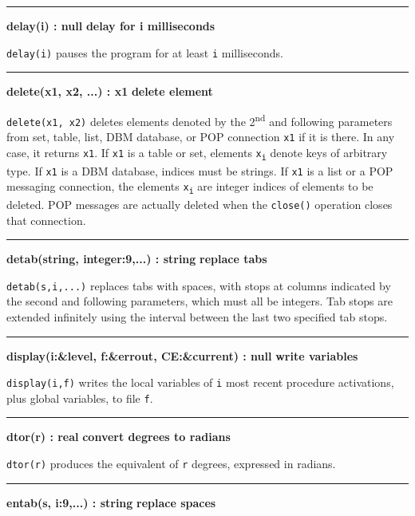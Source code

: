 \bigskip\hrule\vspace{0.1cm}
\noindent
{\bf delay(i) : null } \hfill {\bf delay for i milliseconds}

\noindent
{}\texttt{delay(i)} pauses the program for at least
\texttt{i} milliseconds.

\bigskip\hrule\vspace{0.1cm}
\noindent
{\bf delete(x1, x2, ...) : x1 } \hfill {\bf delete element}\WarningNotThreadSafe

\noindent
{}\texttt{delete(x1, x2)} deletes elements denoted by the
2\textsuperscript{nd} and following parameters from set, table, list,
DBM database, or POP connection \texttt{x1} if it is there. In any case, it
returns \texttt{x1}. If \texttt{x1} is a table or set, elements
\texttt{x\textsubscript{i}} denote
keys of arbitrary type. If \texttt{x1} is a DBM database, indices must be
strings. If \texttt{x1} is a list or a POP messaging connection,
the elements \texttt{x\textsubscript{i}} are
integer indices of elements to be deleted. POP messages are actually
deleted when the \texttt{close()} operation closes that connection.

\bigskip\hrule\vspace{0.1cm}
\noindent
{\bf detab(string, integer:9,...) : string } \hfill {\bf replace tabs}

\noindent
\texttt{detab(s,i,...)} replaces tabs with spaces, with stops at columns
indicated by the second and following parameters, which must all be
integers. Tab stops are extended infinitely using the interval between
the last two specified tab stops.

\bigskip\hrule\vspace{0.1cm}
\noindent
{\bf display(i:\&level, f:\&errout, CE:\&current) : null } \hfill {\bf write variables}

\noindent
{}\texttt{display(i,f)} writes the local variables
of \texttt{i} most recent procedure activations, plus global
variables, to file \texttt{f}.

\bigskip\hrule\vspace{0.1cm}
\noindent
{\bf dtor(r) : real } \hfill {\bf convert degrees to radians}

\noindent
{}\texttt{dtor(r)}
produces the equivalent of \texttt{r} degrees, expressed in radians.

\bigskip\hrule\vspace{0.1cm}
\noindent
{\bf entab(s, i:9,...) : string } \hfill {\bf replace spaces}

